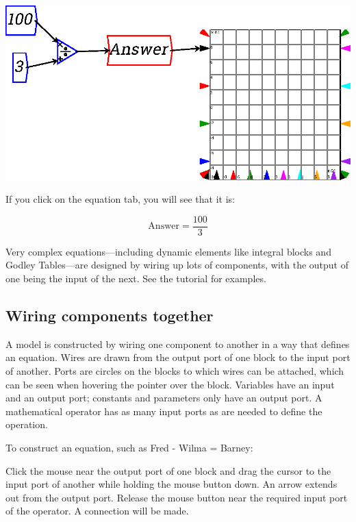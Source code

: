 \begin{center}
  \includegraphics{images/NewItem129.eps}
\end{center}

If you click on the equation tab, you will see that it is:

\begin{displaymath}
\mathrm{Answer}=\frac{100}{3}
\end{displaymath}

Very complex equations---including dynamic elements like integral
blocks and Godley Tables---are designed by wiring up lots of
components, with the output of one being the input of the next. See
the tutorial for examples.

\subsection{Wiring components together}

A model is constructed by wiring one component to another in a way
that defines an equation. Wires are drawn from the output port of one
block to the input port of another. Ports are circles on the blocks to
which wires can be attached, which can be seen when hovering the
pointer over the block. Variables have an input and an output
port; constants and parameters only have an output port. A
mathematical operator has as many input ports as are needed to define
the operation.


To construct an equation, such as Fred - Wilma = Barney:

Click the mouse near the output port of one block and drag the
cursor to the input port of another while holding the mouse button
down. An arrow extends out from the output port. Release the mouse
button near the required input port of the operator. A connection will
be made.

